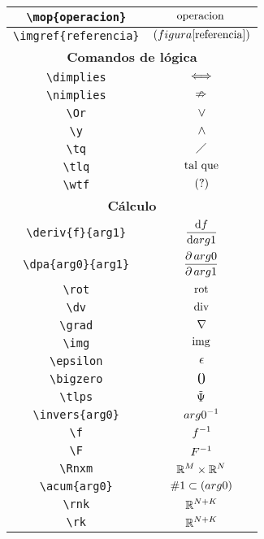 \begin{longtable}{|c|c|}
 \hline\verb|\mop{operacion}| & $\displaystyle\mathrm{operacion}\,$ \\ \midrule 
\verb|\imgref{referencia}| & $\displaystyle\imgref{referencia}$ \\ \midrule 
\bottomrule \multicolumn{2}{|c|}{\textbf{Comandos de lógica}} \\ \toprule 
\verb|\dimplies| & $\displaystyle\iff$ \\ \midrule 
\verb|\nimplies| & $\displaystyle\nRightarrow$ \\ \midrule 
\verb|\Or| & $\displaystyle\vee$ \\ \midrule 
\verb|\y| & $\displaystyle\wedge$ \\ \midrule 
\verb|\tq| & $\displaystyle\;\diagup\;$ \\ \midrule 
\verb|\tlq| & $\displaystyle\text{ tal que }$ \\ \midrule 
\verb|\wtf| & $\displaystyle(?)$ \\ \midrule 
\bottomrule \multicolumn{2}{|c|}{\textbf{Cálculo}} \\ \toprule 
\verb|\deriv{f}{arg1}| & $\displaystyle\frac{\operatorname{d\!}{} f}{\operatorname{d\!}{} arg1}$ \\ \midrule 
\verb|\dpa{arg0}{arg1}| & $\displaystyle\frac{\partial\,arg0}{\partial\, arg1}$ \\ \midrule 
\verb|\rot| & $\displaystyle\operatorname{rot}$ \\ \midrule 
\verb|\dv| & $\displaystyle\operatorname{div}$ \\ \midrule 
\verb|\grad| & $\displaystyle\nabla$ \\ \midrule 
\verb|\img| & $\displaystyle\operatorname{img}$ \\ \midrule 
\verb|\epsilon| & $\displaystyle\epsilon$ \\ \midrule 
\verb|\bigzero| & $\displaystyle\text{\Large 0}$ \\ \midrule 
\verb|\tlps| & $\displaystyle\tilde{\Psi}$ \\ \midrule 
\verb|\invers{arg0}| & $\displaystyle arg0 ^ {-1}$ \\ \midrule 
\verb|\f| & $\displaystyle f ^ {-1}$ \\ \midrule 
\verb|\F| & $\displaystyle F ^ {-1}$ \\ \midrule 
\verb|\Rnxm| & $\displaystyle\mathbb{R}^M\times\mathbb{R}^N$ \\ \midrule 
\verb|\acum{arg0}| & $\displaystyle\acum{arg0}$ \\ \midrule 
\verb|\rnk| & $\displaystyle\mathbb{R}^{N+K}$ \\ \midrule 
\verb|\rk| & $\displaystyle\mathbb{R}^{N+K}$ \\ \midrule 

\end{longtable}
